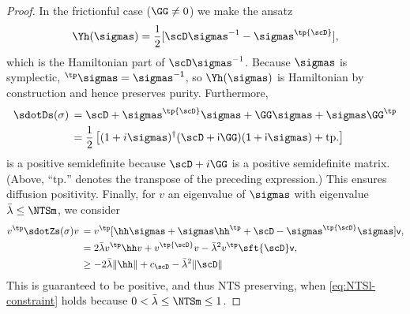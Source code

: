 \documentclass{article}
\numberwithin{equation}{section}
\begin{document}
\begin{proof}
In the frictionful case ($\GG \neq 0$) we make the ansatz
\begin{align}\label{eq:y-ansatz-frictionful}
    \Yh(\sigmas) = \frac{1}{2}[{\scD}\sigmas^{-1} - \sigmas \sf^\tp { \scD} \sf],
\end{align}
which is the Hamiltonian part of ${\scD}\sigmas^{-1}$.  Because $\sigmas$ is symplectic, $\sf^\tp \sigmas \sf = \sigmas^{-1}$, so $\Yh(\sigmas)$ is Hamiltonian by construction and hence preserves purity. Furthermore,
\begin{align}
    \sdotDs (\sigma) \,
    &= {\scD} + \sigmas \sf^\tp {\scD} \sf \sigmas + \GG\sigmas+\sigmas\GG^\tp  \\
    & = \frac{1}{2} \left[(1+i\sf\sigmas)^\dagger({\scD} + i \GG \sf)(1+i\sf\sigmas) + \mathrm{tp.} \right]
\end{align}
is a positive semidefinite because ${\scD} + i \GG \sf$ is a positive semidefinite matrix. (Above, ``$\mathrm{tp.}$'' denotes the transpose of the preceding expression.)  This ensures diffusion positivity. Finally, for 
$v$ 
an eigenvalue of $\sigmas$ with eigenvalue $\bar{\lambda} \le \NTSm$, we consider
\begin{align}
    v^\tp\sdotZs(\sigma)v \, 
    &= v^\tp [\hh \sigmas + \sigmas \hh^\tp +  {\scD} -  \sigmas \sf^\tp {\scD} \sf \sigmas  ] v, \\
    &= 2\bar{\lambda} v^\tp \hh v +  v^\tp{\scD}v  -\bar{\lambda}^2 v^\tp \sft {\scD} \sf v , \\
    &\ge - 2\bar{\lambda} \|\hh\| +   c_{{\scD}} -  \bar{\lambda}^2 \|{\scD}\| 
\end{align}
This is guaranteed to be positive, and thus NTS preserving, when \eqref{eq:NTSl-constraint} holds because $0<\bar{\lambda} \le \NTSm \le 1$.


\end{proof}
\end{document}

